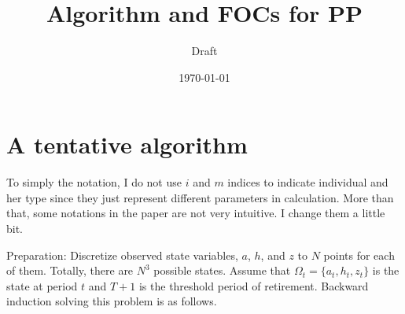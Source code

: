 \documentclass{article}
\title{Algorithm and FOCs for PP}
\author{Draft}
\date{\today}
\begin{document}
\maketitle
\section{A tentative algorithm}
	To simply the notation, I do not use $i$ and $m$ indices to indicate individual and her type since they just represent different parameters in calculation. More than that, some notations in the paper are not very intuitive. I change them a little bit. \par 
	Preparation: Discretize observed state variables, $a$, $h$, and $z$ to $N$ points for each of them. Totally, there are $N^3$ possible states. Assume that $\Omega_t = \{ a_t, h_t, z_t \}$ is the state at period $t$ and $T+1$ is the threshold period of retirement. Backward induction solving this problem is as follows. \par
\end{document}
